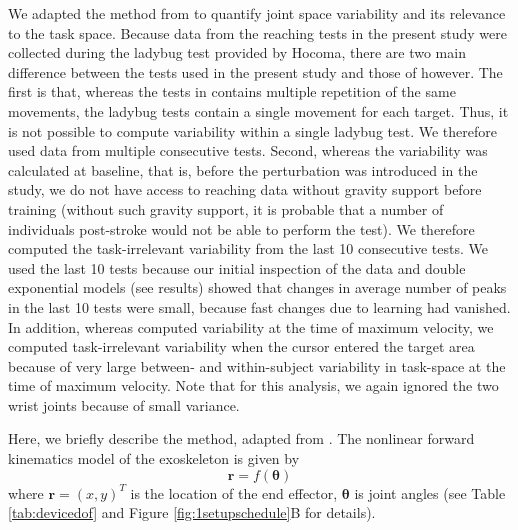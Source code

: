 We adapted the method from \cite{Singh2016} to quantify joint space variability and its relevance to the task space. 
Because data from the reaching tests in the present study were collected during the ladybug test provided by Hocoma, there are two main difference between the tests used in the present study and those of \cite{Singh2016} however. 
The first is that, whereas the tests in \cite{Singh2016} contains multiple repetition of the same movements, the ladybug tests contain a single movement for each target. 
Thus, it is not possible to compute variability within a single ladybug test. 
We therefore used data from multiple consecutive tests. 
Second, whereas the variability was calculated at baseline, that is, before the perturbation was introduced in the \cite{Singh2016} study, we do not have access to reaching data without gravity support before training (without such gravity support, it is probable that a number of individuals post-stroke would not be able to perform the test). 
We therefore  computed the task-irrelevant variability from the last 10 consecutive tests. 
We used the last 10 tests because our initial inspection of the data and double exponential models (see results) showed that changes in average number of peaks in the last 10 tests were small, because fast changes due to learning had vanished. 
In addition, whereas \cite{Singh2016} computed variability at the time of maximum velocity, we computed task-irrelevant variability when the cursor entered the target area because of very large between- and within-subject variability in task-space at the time of maximum velocity.
Note that for this analysis, we again ignored the two wrist joints because of small variance. 

Here, we briefly describe the method, adapted from \cite{Singh2016}.
The nonlinear forward kinematics model of the exoskeleton is given by
	\begin{equation}\label{eqn:nonlinearForwardKinematics}
		\bm{r} = f(\bm{\theta})
	\end{equation}
where $ \bm{r} = (x,y)^T $ is the location of the end effector, $ \bm{\theta} $ is joint angles (see Table \ref{tab:devicedof} and Figure \ref{fig:1setupschedule}B for details). 

